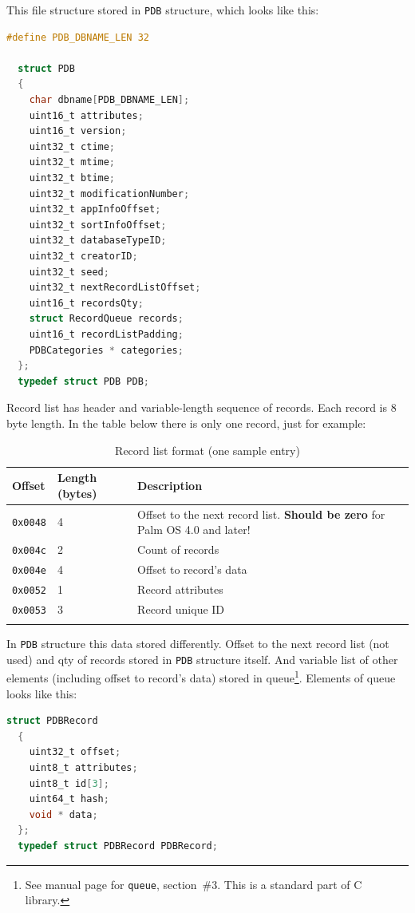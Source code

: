 \documentclass[a4paper,12pt,oneside]{scrartcl}
\begin{document}
This file structure stored in \texttt{PDB} structure, which looks like this:
\begin{lstlisting}[language=C, caption={C structure to store PDB file contents in
    memory}]
  #define PDB_DBNAME_LEN 32

  struct PDB
  {
	char dbname[PDB_DBNAME_LEN];
	uint16_t attributes;
	uint16_t version;
	uint32_t ctime;
	uint32_t mtime;
	uint32_t btime;
	uint32_t modificationNumber;
	uint32_t appInfoOffset;
	uint32_t sortInfoOffset;
	uint32_t databaseTypeID;
	uint32_t creatorID;
	uint32_t seed;
	uint32_t nextRecordListOffset;
	uint16_t recordsQty;
	struct RecordQueue records;
	uint16_t recordListPadding;
	PDBCategories * categories;
  };
  typedef struct PDB PDB;
\end{lstlisting}

Record list has header and variable-length sequence of records. Each record is 8
byte length. In the table below there is only one record, just for example:
\begin{longtable}{|p{2cm}|p{4cm}|p{7cm}|}
  \hline
  \textbf{Offset} & \textbf{Length (bytes)} & \textbf{Description} \\
  \hline
  \texttt{0x0048} & 4 & Offset to the next record list. \textbf{Should be zero} for Palm OS 4.0 and later! \\
  \hline
  \texttt{0x004c} & 2 & Count of records \\
  \hline
  \texttt{0x004e} & 4 & Offset to record's data \\
  \hline
  \texttt{0x0052} & 1 & Record attributes \\
  \hline
  \texttt{0x0053} & 3 & Record unique ID \\
  \hline
  \caption{Record list format (one sample entry)}
  \label{tab:record-list-format}
\end{longtable}

In \texttt{PDB} structure this data stored differently. Offset to the next
record list (not used) and qty of records stored in \texttt{PDB} structure
itself. And variable list of other elements (including offset to record's data)
stored in queue\footnote{See manual page for \texttt{queue}, section~\#3. This
  is a standard part of C library.}. Elements of queue looks like this:
\begin{lstlisting}[language=C, caption={C structure to store one element of
    record from PDB file}]
  struct PDBRecord
  {
	uint32_t offset;
	uint8_t attributes;
	uint8_t id[3];
	uint64_t hash;
	void * data;
  };
  typedef struct PDBRecord PDBRecord;
\end{lstlisting}
\end{document}
